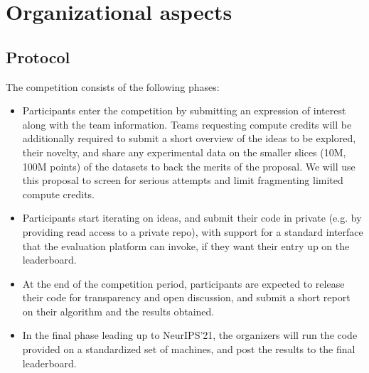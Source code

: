 


\section{Organizational aspects}


\subsection{Protocol}





The competition consists of the following phases:
\begin{itemize}
\item Participants enter the competition by submitting an expression
  of interest along with the team information. Teams requesting
  compute credits will be additionally required to submit a short
  overview of the ideas to be explored, their novelty, and share any
  experimental data on the smaller slices (10M, 100M points) of the
  datasets to back the merits of the proposal. We will use this
  proposal to screen for serious attempts and limit fragmenting
  limited compute credits.
\item Participants start iterating on ideas, and submit their code in private
  (e.g. by providing read access to a private repo), with support for
  a standard interface that the evaluation platform can invoke, if
  they want their entry up on the leaderboard.
\item At the end of the competition period, participants are expected
  to release their code for transparency and open discussion, and
  submit a short report on their algorithm and the results obtained.
\item In the final phase leading up to NeurIPS'21, the organizers will
  run the code provided on a standardized set of machines, and post
  the results to the final leaderboard.
\end{itemize}

